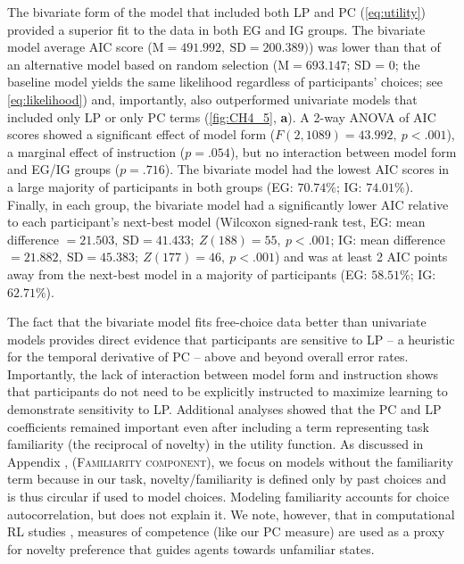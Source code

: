 The bivariate form of the model that included both \ac{LP} and \ac{PC} (\cref{eq:utility}) provided a superior fit to the data in both \ac{EG} and \ac{IG} groups. The bivariate model average AIC score ($\text{M}=491.992,\ \text{SD}=200.389)$) was lower than that of an alternative model based on random selection ($\text{M} = 693.147$; SD = 0; the baseline model yields the same likelihood regardless of participants' choices; see \cref{eq:likelihood}) and, importantly, also outperformed univariate models that included only \ac{LP} or only \ac{PC} terms (\cref{fig:CH4_5}, \textbf{a}). A 2-way ANOVA of AIC scores showed a significant effect of model form ($F(2, 1089) = 43.992, \ p < .001$), a marginal effect of instruction ($p = .054$), but no interaction between model form and \ac{EG}/\ac{IG} groups ($p = .716$). The bivariate model had the lowest AIC scores in a large majority of participants in both groups (\ac{EG}: $70.74\%$; \ac{IG}: $74.01\%$). Finally, in each group, the bivariate model had a significantly lower AIC relative to each participant's next-best model (Wilcoxon signed-rank test, \ac{EG}: mean difference $=21.503,\ \text{SD} = 41.433;\ Z(188) = 55,\ p < .001$; \ac{IG}: mean difference $=21.882,\ \text{SD} = 45.383;\ Z(177) = 46,\ p < .001$) and was at least 2 AIC points away from the next-best model in a majority of participants (\ac{EG}: $58.51\%$; \ac{IG}: $62.71\%$).   

The fact that the bivariate model fits free-choice data better than univariate models provides direct evidence that participants are sensitive to \ac{LP} – a heuristic for the temporal derivative of \ac{PC} – above and beyond overall error rates. Importantly, the lack of interaction between model form and instruction shows that participants do not need to be explicitly instructed to maximize learning to demonstrate sensitivity to \ac{LP}. Additional analyses showed that the \ac{PC} and \ac{LP} coefficients remained important even after including a term representing task familiarity (the reciprocal of novelty) in the utility function. As discussed in Appendix , (\textsc{Familiarity component}), we focus on models without the familiarity term because in our task, novelty/familiarity is defined only by past choices and is thus circular if used to model choices. Modeling familiarity accounts for choice autocorrelation, but does not explain it. We note, however, that in computational \ac{RL} studies \parencite{pathak_curiosity-driven_2017,bougie2020fast}, measures of competence (like our \ac{PC} measure) are used as a proxy for novelty preference that guides agents towards unfamiliar states.

